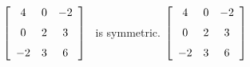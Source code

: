 {$\left[ \begin {array}{ccc} 4&0&-2\\\noalign{\medskip}0&2&3
\\\noalign{\medskip}-2&3&6\end {array} \right]$} 
{\tta\ is symmetric. $\left[ \begin {array}{ccc} 4&0&-2\\\noalign{\medskip}0&2&3\\\noalign{\medskip}-2&3&6\end {array} \right]
$}


  

